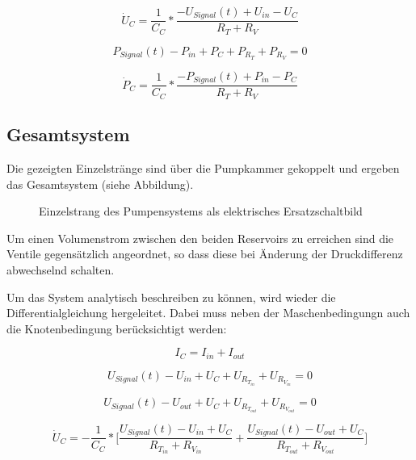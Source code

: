 \documentclass[fontsize=12pt, a4paper]{scrartcl}
\begin{document}
\begin{equation}
	\dot{U}_{C} = \frac{1}{C_{C}} * \frac{-U_{Signal}(t)+U_{in}-U_{C}}{R_{T}+R_{V}}
\end{equation}

\begin{equation}
	P_{Signal}(t) - P_{in} + P_{C} + P_{R_{T}} + P_{R_{V}} = 0
\end{equation}

\begin{equation}
	\dot{P}_{C} = \frac{1}{C_{C}} * \frac{-P_{Signal}(t)+P_{in}-P_{C}}{R_{T}+R_{V}}
\end{equation}


\subsection{Gesamtsystem}

Die gezeigten Einzelstränge sind über die Pumpkammer gekoppelt und ergeben das Gesamtsystem (siehe Abbildung).


\begin{figure}
	
	\caption{Einzelstrang des Pumpensystems als elektrisches Ersatzschaltbild}
	\label{systemcircuit}
\end{figure}

Um einen Volumenstrom zwischen den beiden Reservoirs zu erreichen sind die Ventile gegensätzlich angeordnet, so dass diese bei Änderung der Druckdifferenz abwechselnd schalten. 

Um das System analytisch beschreiben zu können, wird wieder die Differentialgleichung hergeleitet. Dabei muss neben der Maschenbedingungn auch die Knotenbedingung berücksichtigt werden:

\begin{equation}
	I_{C} = I_{in} + I_{out}
\end{equation}

\begin{equation}
	U_{Signal}(t) - U_{in} + U_{C} + U_{R_{T_{in}}} + U_{R_{V_{in}}} = 0
\end{equation}

\begin{equation}
	U_{Signal}(t) - U_{out} + U_{C} + U_{R_{T_{out}}} + U_{R_{V_{out}}} = 0
\end{equation}

\begin{equation}
	\dot{U}_{C} = - \frac{1}{C_{C}} * \biggl[\frac{U_{Signal}(t)-U_{in}+U_{C}}{R_{T_{in}}+R_{V_{in}}} + \frac{U_{Signal}(t)-U_{out}+U_{C}}{R_{T_{out}}+R_{V_{out}}}\biggr]
\end{equation}
\end{document}
